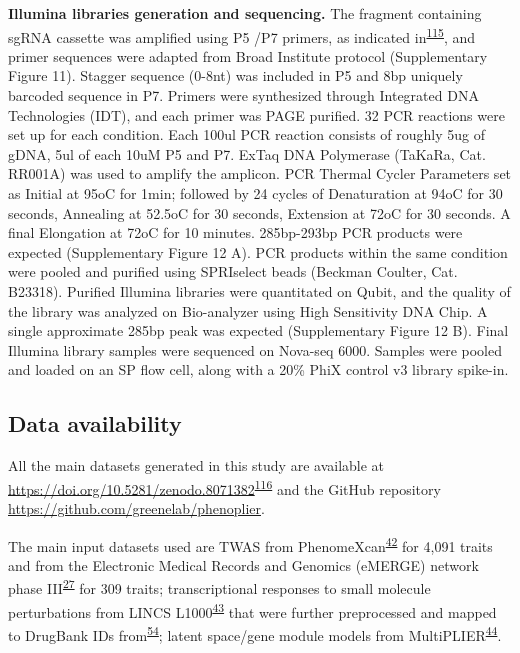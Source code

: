 \documentclass[
  a4paper,
]{article}
\begin{document}
\textbf{Illumina libraries generation and sequencing.}
The fragment containing sgRNA cassette was amplified using P5 /P7 primers, as indicated in\textsuperscript{\protect\hyperlink{ref-vNXTnmxp}{115}}, and primer sequences were adapted from Broad Institute protocol (Supplementary Figure 11).
Stagger sequence (0-8nt) was included in P5 and 8bp uniquely barcoded sequence in P7.
Primers were synthesized through Integrated DNA Technologies (IDT), and each primer was PAGE purified.
32 PCR reactions were set up for each condition.
Each 100ul PCR reaction consists of roughly 5ug of gDNA, 5ul of each 10uM P5 and P7.
ExTaq DNA Polymerase (TaKaRa, Cat. RR001A) was used to amplify the amplicon.
PCR Thermal Cycler Parameters set as Initial at 95oC for 1min; followed by 24 cycles of Denaturation at 94oC for 30 seconds, Annealing at 52.5oC for 30 seconds, Extension at 72oC for 30 seconds.
A final Elongation at 72oC for 10 minutes.
285bp-293bp PCR products were expected (Supplementary Figure 12 A).
PCR products within the same condition were pooled and purified using SPRIselect beads (Beckman Coulter, Cat. B23318).
Purified Illumina libraries were quantitated on Qubit, and the quality of the library was analyzed on Bio-analyzer using High Sensitivity DNA Chip.
A single approximate 285bp peak was expected (Supplementary Figure 12 B).
Final Illumina library samples were sequenced on Nova-seq 6000.
Samples were pooled and loaded on an SP flow cell, along with a 20\% PhiX control v3 library spike-in.

\hypertarget{data-availability}{%
\subsection{Data availability}\label{data-availability}}

All the main datasets generated in this study are available at \url{https://doi.org/10.5281/zenodo.8071382}\textsuperscript{\protect\hyperlink{ref-cygmsEBt}{116}} and the GitHub repository \url{https://github.com/greenelab/phenoplier}.

The main input datasets used are TWAS from PhenomeXcan\textsuperscript{\protect\hyperlink{ref-lY5ln3dB}{42}} for 4,091 traits and from the Electronic Medical Records and Genomics (eMERGE) network phase III\textsuperscript{\protect\hyperlink{ref-gZAOkumx}{27}} for 309 traits;
transcriptional responses to small molecule perturbations from LINCS L1000\textsuperscript{\protect\hyperlink{ref-F7lIlh2N}{43}} that were further preprocessed and mapped to DrugBank IDs from\textsuperscript{\protect\hyperlink{ref-1DJZvtwP1}{54}};
latent space/gene module models from MultiPLIER\textsuperscript{\protect\hyperlink{ref-14rnBunuZ}{44}}.
\end{document}
